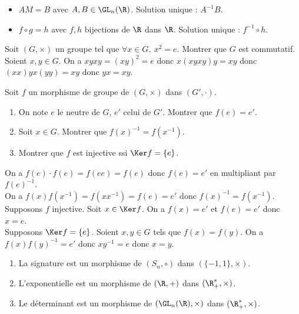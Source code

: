 \documentclass[11pt]{article}
\begin{document}
\begin{ex}{}{}
    \begin{itemize}
        \item $AM=B$ avec $A,B\in\GL_n(\R)$. Solution unique : $A^{-1}B$.
        \item $f\circ g = h$ avec $f,h$ bijections de $\R$ dans $\R$. Solution unique : $f^{-1}\circ h$.
    \end{itemize}
\end{ex}

\vspace*{-0.7cm}

\begin{exercice}{}{}
    Soit $(G,\times)$ un groupe tel que $\forall x \in G, ~ x^2=e$. Montrer que $G$ est commutatif.
    \tcblower
    Soient $x,y\in G$. On a $xyxy=(xy)^2=e$ donc $x(xyxy)y=xy$ donc $(xx)yx(yy)=xy$ donc $yx=xy$.
\end{exercice}

\vspace*{-0.7cm}

\begin{ex}{}{}
    Soit $f$ un morphisme de groupe de $(G,\times)$ dans $(G',\cdot)$.
    \begin{enumerate}
        \item On note $e$ le neutre de $G$, $e'$ celui de $G'$. Montrer que $f(e)=e'$.
        \item Soit $x\in G$. Montrer que $f(x)^{-1}=f(x^{-1})$.
        \item Montrer que $f$ est injective ssi $\Ker f = \{e\}$.
    \end{enumerate}
    \tcblower
     On a $f(e)\cdot f(e)=f(ee)=f(e)$ donc $f(e)=e'$ en multipliant par $f(e)^{-1}$.\\
     On a $f(x)f(x^{-1})=f(xx^{-1})=f(e)=e'$ donc $f(x)^{-1}=f(x^{-1})$.\\
     Supposons $f$ injective. Soit $x\in\Ker f$. On a $f(x)=e'$ et $f(e)=e'$ donc $x=e$.\\
    Supposons $\Ker f=\{e\}$. Soient $x,y\in G$ tels que $f(x)=f(y)$. On a $f(x)f(y)^{-1}=e'$ donc $xy^{-1}=e$ donc $x=y$.
\end{ex}

\vspace*{-0.7cm}

\begin{ex}{}{}
    \begin{enumerate}
        \item La signature est un morphisme de $(S_n,\circ)$ dans $(\{-1,1\},\times)$.
        \item L'exponentielle est un morphisme de $(\R,+)$ dans $(\R^*_+,\times)$.
        \item Le déterminant est un morphisme de $(\GL_n(\R),\times)$ dans $(\R^*_+,\times)$.
    \end{enumerate}
\end{ex}
\end{document}
